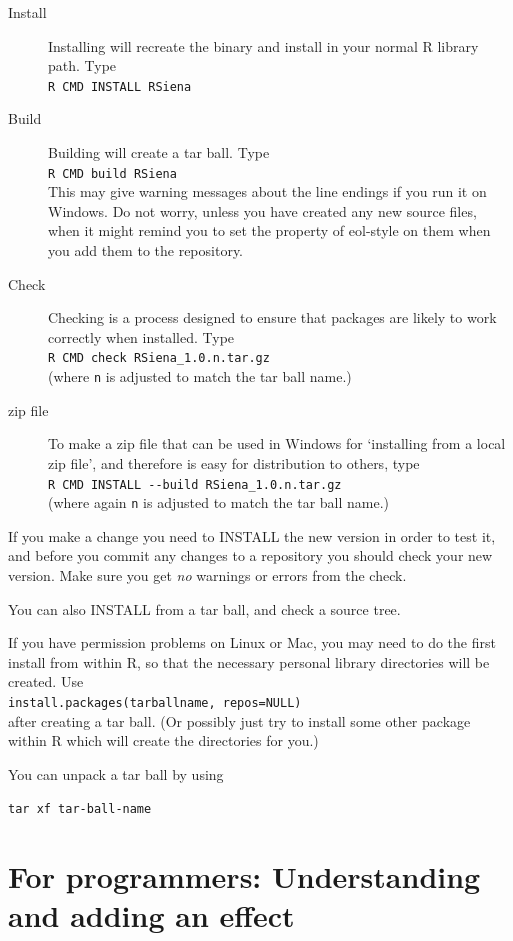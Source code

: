 \documentclass[a4paper,fleqn,11pt]{article}
\newcommand{\+}{\, + \,}
\begin{document}
\begin{description}
\item[Install] Installing will recreate the binary and install in your normal R
  library path. Type\\
\verb|R CMD INSTALL RSiena|
\item[Build] Building will create a tar ball. Type\\
\verb|R CMD build RSiena|\\
This may give warning messages about the line endings if you run it on
Windows. Do not worry, unless you have created any new source files, when it
might remind you to set the property of \textsf{eol-style} on them when you add
them to the repository.
\item [Check] Checking is a process designed to ensure that packages are likely
  to work correctly when installed. Type\\
\verb|R CMD check RSiena_1.0.n.tar.gz|\\
(where \verb|n| is adjusted to match the tar ball name.)
\item[zip file] To make a zip file that can be used in Windows for
`installing from a local zip file', and therefore is easy for distribution
to others, type\\
\verb|R CMD INSTALL --build RSiena_1.0.n.tar.gz| \\
(where again \verb|n| is adjusted to match the tar ball name.)
\end{description}

If you make a change you need to \textsf{INSTALL} the new version in order to
test it, and before you commit any changes to a repository you should
\textsf{check} your new version. Make sure you get \emph{no} warnings or
errors from the check.

You can also \textsf{INSTALL} from a tar ball, and \textsf{check} a source
tree.

If you have permission problems on Linux or Mac, you may need to do the first
install from within \textsf{R}, so that the necessary personal library
directories will be created. Use\\
\verb|install.packages(tarballname, repos=NULL)| \\after creating a tar
ball. (Or possibly just try to install some other package within R which will
create the directories for you.)

You can unpack a tar ball by using

\verb|tar xf tar-ball-name|

\section{For programmers: Understanding and adding an effect}
\end{document}
